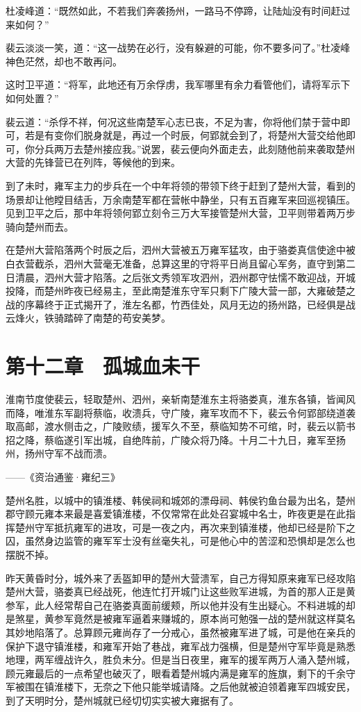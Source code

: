 杜凌峰道：“既然如此，不若我们奔袭扬州，一路马不停蹄，让陆灿没有时间赶过来如何？”

裴云淡淡一笑，道：“这一战势在必行，没有躲避的可能，你不要多问了。”杜凌峰神色茫然，却也不敢再问。

这时卫平道：“将军，此地还有万余俘虏，我军哪里有余力看管他们，请将军示下如何处置？”

裴云道：“杀俘不祥，何况这些南楚军心志已丧，不足为害，你将他们禁于营中即可，若是有变你们脱身就是，再过一个时辰，何郢就会到了，将楚州大营交给他即可，你分兵两万去楚州接应我。”说罢，裴云便向外面走去，此刻随他前来袭取楚州大营的先锋营已在列阵，等候他的到来。

到了未时，雍军主力的步兵在一个中年将领的带领下终于赶到了楚州大营，看到的场景却让他瞠目结舌，万余南楚军都在营帐中静坐，只有五百雍军来回巡视镇压。见到卫平之后，那中年将领何郢立刻令三万大军接管楚州大营，卫平则带着两万步骑向楚州而去。

在楚州大营陷落两个时辰之后，泗州大营被五万雍军猛攻，由于骆娄真信使途中被白衣营截杀，泗州大营毫无准备，总算这里的守将平日尚且留心军务，直守到第二日清晨，泗州大营才陷落。之后张文秀领军攻泗州，泗州郡守怯懦不敢迎战，开城投降，而楚州昨夜已经易主，至此南楚淮东守军只剩下广陵大营一部，大雍破楚之战的序幕终于正式揭开了，淮左名都，竹西佳处，风月无边的扬州路，已经俱是战云烽火，铁骑踏碎了南楚的苟安美梦。

\chapter{第十二章　孤城血未干}

淮南节度使裴云，轻取楚州、泗州，亲斩南楚淮东主将骆娄真，淮东各镇，皆闻风而降，唯淮东军副将蔡临，收溃兵，守广陵，雍军攻而不下，裴云令何郢部绕道袭取高邮，渡水侧击之，广陵败绩，援军久不至，蔡临知势不可绾，时，裴云以箭书招之降，蔡临遂引军出城，自绝阵前，广陵众将乃降。十月二十九日，雍军至扬州，扬州守军不战而溃。

——《资治通鉴·雍纪三》

楚州名胜，以城中的镇淮楼、韩侯祠和城郊的漂母祠、韩侯钓鱼台最为出名，楚州郡守顾元雍本来最是喜爱镇淮楼，不仅常常在此处召宴城中名士，昨夜更是在此指挥楚州守军抵抗雍军的进攻，可是一夜之内，再次来到镇淮楼，他却已经是阶下之囚，虽然身边监管的雍军军士没有丝毫失礼，可是他心中的苦涩和恐惧却是怎么也摆脱不掉。

昨天黄昏时分，城外来了丢盔卸甲的楚州大营溃军，自己方得知原来雍军已经攻陷楚州大营，骆娄真已经战死，他连忙打开城门让这些败军进城，为首的那人正是黄参军，此人经常帮自己在骆娄真面前缓颊，所以他并没有生出疑心。不料进城的却是煞星，黄参军竟然是被雍军逼着来赚城的，原本尚可勉强一战的楚州就这样莫名其妙地陷落了。总算顾元雍尚存了一分戒心，虽然被雍军进了城，可是他在亲兵的保护下退守镇淮楼，和雍军开始了巷战，雍军战力强横，但是楚州守军毕竟是熟悉地理，两军缠战许久，胜负未分。但是当日夜里，雍军的援军两万人涌入楚州城，顾元雍最后的一点希望也破灭了，眼看着楚州城内满是雍军的旌旗，剩下的千余守军被围在镇淮楼下，无奈之下他只能举城请降。之后他就被迫领着雍军四城安民，到了天明时分，楚州城就已经切切实实被大雍据有了。

